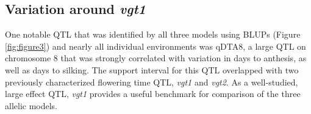 \documentclass[article,9pt,twocolumn,twoside]{rilabRxiv}
\begin{document}


\subsection{Variation around \emph{vgt1}}
One notable QTL that was identified by all three models using BLUPs (Figure \ref{fig:figure3}) and nearly all individual environments was qDTA8, a large QTL on chromosome 8 that was strongly correlated with variation in days to anthesis, as well as days to silking.
The support interval for this QTL overlapped with two previously characterized flowering time QTL, \emph{vgt1} and \emph{vgt2}.
As a well-studied, large effect QTL, \emph{vgt1} provides a useful benchmark for comparison of the three allelic models.
\end{document}
